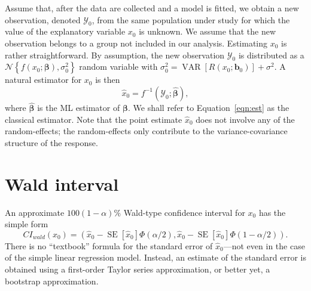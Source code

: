 \documentclass{article}\usepackage[]{graphicx}\usepackage[]{color}
\newcommand{\VAR}{\operatorname{VAR}}
\newcommand{\SE}{\operatorname{SE}}
\begin{document}
Assume that, after the data are collected and a model is fitted, we obtain a new observation, denoted $\mathcal{Y}_0$, from the same population under study for which the value of the explanatory variable $x_0$ is unknown.  We assume that the new observation belongs to a group not included in our analysis.  Estimating $x_0$ is rather straightforward.  By assumption, the new observation $\mathcal{Y}_0$ is distributed as a $\mathcal{N}\left\{f\left(x_0; \bm{\beta}\right), \sigma_0^2\right\}$ random variable with $\sigma_0^2 = \VAR\left[ R\left( x_0; \bm{b}_0 \right) \right ] + \sigma^2$.  A natural estimator for $x_0$ is then
\begin{equation}
\label{eqn:est}
  \widehat{x}_0 = f^{-1}\left(\mathcal{Y}_0; \widehat{\bm{\beta}}\right),
\end{equation}
where $\widehat{\bm{\beta}}$ is the ML estimator of $\bm{\beta}$.  We shall refer to Equation~\eqref{eqn:est} as the classical estimator.  Note that the point estimate $\widehat{x}_0$ does not involve any of the random-effects; the random-effects only contribute to the variance-covariance structure of the response.



\section{Wald interval}\label{sec:wald}

An approximate $100(1-\alpha)\%$ Wald-type confidence interval for $x_0$ has the simple form
\begin{equation}
\label{eqn:wald}
  CI_{wald}\left(x_0\right) = \left( \widehat{x}_0 -  \SE\left[\widehat{x}_0\right]\Phi\left(\alpha/2\right),  \widehat{x}_0 -  \SE\left[\widehat{x}_0\right]\Phi\left(1-\alpha/2\right) \right).
\end{equation}
There is no ``textbook'' formula for the standard error of $\widehat{x}_0$---not even in the case of the simple linear regression model. Instead, an estimate of the standard error is obtained using a first-order Taylor series approximation, or better yet, a bootstrap approximation.  
\end{document}

